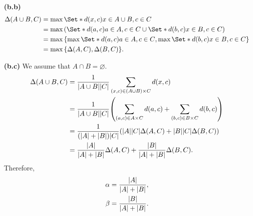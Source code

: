 \documentclass{article}
\makeatletter
\newcommand*{\shifttext}[1]{%
  \settowidth{\@tempdima}{#1}%
  \hspace{-\@tempdima}#1%
}
\newcommand{\plabel}[1]{%
\shifttext{\textbf{#1}\quad}%
}
\makeatother
\begin{document}
\plabel{(b.b)}%
\abovedisplayskip=0pt\abovedisplayshortskip=0pt~\vspace*{-\baselineskip}%
\begin{align*}
    \Delta(A\cup B, C) &= \max\Set*{d(x,c)}{x\in A\cup B, c\in C} \\
    &= \max\qty(\Set*{d(a,c)}{a\in A, c\in C} \cup \Set*{d(b,c)}{x\in B, c\in C}) \\
    &= \max\qty{\max\Set*{d(a,c)}{a\in A, c\in C}, \max\Set*{d(b,c)}{x\in B, c\in C}} \\
    &= \max\qty{\Delta(A,C), \Delta(B,C)}.
\end{align*}

\plabel{(b.c)}%
We assume that $A\cap B = \varnothing$.
\begin{align*}
    \Delta(A\cup B, C) &= \frac{1}{\abs{A\cup B}\abs{C}} \sum_{(x,c)\in (A\cup B)\times C} d(x,c) \\
    &= \frac{1}{\abs{A\cup B}\abs{C}} \qty(\sum_{(a,c)\in A\times C} d(a,c) + \sum_{(b,c)\in B\times C} d(b,c)) \\
    &= \frac{1}{(\abs{A}+\abs{B})\abs{C}} \qty(\abs{A}\abs{C} \Delta(A,C) + \abs{B}\abs{C} \Delta(B,C)) \\
    &= \frac{\abs{A}}{\abs{A} + \abs{B}} \Delta(A,C) + \frac{\abs{B}}{\abs{A} + \abs{B}} \Delta(B,C).
\end{align*}
Therefore,
\begin{align*}
    \alpha &= \frac{\abs{A}}{\abs{A} + \abs{B}}, \\
    \beta &= \frac{\abs{B}}{\abs{A} + \abs{B}}.
\end{align*}

% 
% 
\end{document}
